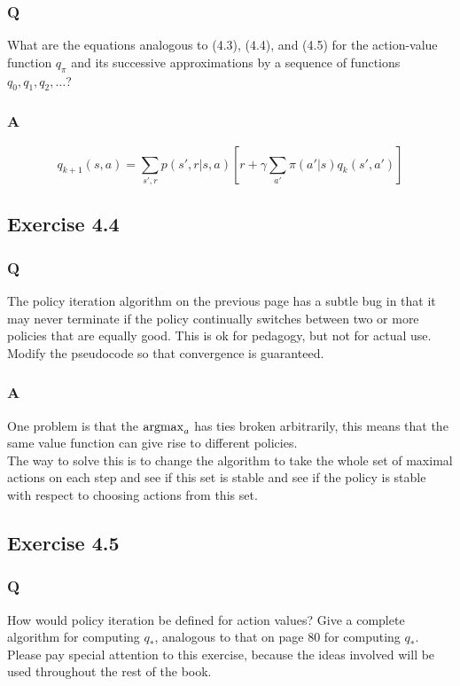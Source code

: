 \subsubsection{Q}
What are the equations analogous to (4.3), (4.4), and (4.5) for the action-value function $q_\pi$ and its successive approximations by a sequence of functions $q_0, q_1, q_2, \dots$?

\subsubsection{A}
\begin{equation}
    q_{k+1}(s, a) = \sum_{s', r} p(s', r | s, a)\left[r + \gamma \sum_{a'} \pi(a'|s)q_k(s', a')\right]
\end{equation}

\subsection{Exercise 4.4}
\subsubsection{Q}
The policy iteration algorithm on the previous page has a subtle bug in that it may never terminate if the policy continually switches between two or more policies that are equally good. This is ok for pedagogy, but not for actual use. Modify the pseudocode so that convergence is guaranteed.

\subsubsection{A}
One problem is that the $\operatorname*{argmax}_a$ has ties broken arbitrarily, this means that the same value function can give rise to different policies.\\

The way to solve this is to change the algorithm to take the whole set of maximal actions on each step and see if this set is stable and see if the policy is stable with respect to choosing actions from this set.


\subsection{Exercise 4.5}
\subsubsection{Q}
How would policy iteration be defined for action values? Give a complete algorithm for computing $q_*$, analogous to that on page 80 for computing $q_*$. Please pay special attention to this exercise, because the ideas involved will be used throughout the rest of the book.

